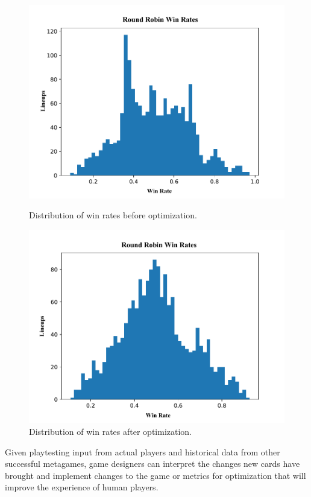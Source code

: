 \documentclass[letterpaper]{article} %
\begin{document}
\begin{figure}[t]
	\includegraphics[scale=0.5]{special_only_4_5_8_8_4_8_3_3_3_5}
	\caption{Distribution of win rates before optimization. }
	\label{fig:special_only_dist_before}

	\includegraphics[scale=0.5]{special_only_1_3_4_3_3_1_7_8_5_7}
	\caption{Distribution of win rates after optimization. }
	\label{fig:special_only_dist_after}
\end{figure}

Given playtesting input from actual players and historical data from other successful metagames, game designers can interpret the %
changes new cards have brought and implement changes to the game or metrics for optimization that will improve the experience of human players.
\end{document}
